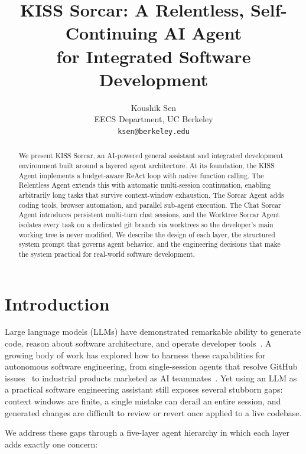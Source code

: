 \documentclass{article}
\title{KISS Sorcar: A Relentless, Self-Continuing AI Agent \\
  for Integrated Software Development}
\author{%
  Koushik Sen \\
  EECS Department, UC Berkeley\\
  \texttt{ksen@berkeley.edu} \\
}
\begin{document}
\maketitle

\begin{abstract}
We present KISS Sorcar, an AI-powered general assistant and integrated
development environment built around a layered agent architecture.  At
its foundation, the KISS Agent implements a budget-aware ReAct loop
with native function calling.  The Relentless Agent extends this with
automatic multi-session continuation, enabling
arbitrarily long tasks that survive context-window exhaustion.  The
Sorcar Agent adds coding tools, browser automation, and parallel
sub-agent execution.  The Chat Sorcar Agent introduces persistent
multi-turn chat sessions, and the Worktree Sorcar Agent isolates every
task on a dedicated git branch via worktrees so the developer's main
working tree is never modified.  We describe the design of each layer,
the structured system prompt that governs agent behavior, and the
engineering decisions that make the system practical for real-world
software development.
\end{abstract}

\section{Introduction}
\label{sec:intro}

Large language models (LLMs) have demonstrated remarkable ability to
generate code, reason about software architecture, and operate
developer tools~\citep{chen2021evaluating,roziere2023code}.  A growing
body of work has explored how to harness these capabilities for
autonomous software engineering, from single-session agents that
resolve GitHub issues~\citep{yang2024sweagent,wang2024openhands} to
industrial products marketed as AI
teammates~\citep{copilot2021,cursor2024,devin2024}.  Yet using an LLM
as a practical software engineering assistant still exposes several
stubborn gaps: context windows are finite, a single mistake can derail
an entire session, and generated changes are difficult to review or
revert once applied to a live codebase.

We address these gaps through a five-layer agent hierarchy in which
each layer adds exactly one concern:
\end{document}
